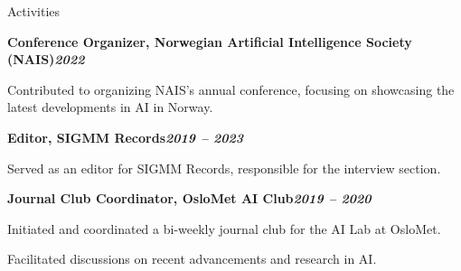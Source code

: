 \begin{rubric}{Activities}
\begin{compactitem}
\end{compactitem}
%
\entry*[]%
\textbf{Conference Organizer, Norwegian Artificial Intelligence Society (NAIS)\hfill\textit{2022}} \par
\begin{compactitem}
    \item Contributed to organizing NAIS's annual conference, focusing on showcasing the latest developments in AI in Norway.
    \vspace{-12pt}
\end{compactitem}
%
\entry*[]%
\textbf{Editor, SIGMM Records\hfill\textit{2019 -- 2023}} \par
\begin{compactitem}
    \item Served as an editor for SIGMM Records, responsible for the interview section.
    \vspace{-12pt}
\end{compactitem}
%
\entry*[]%
\textbf{Journal Club Coordinator, OsloMet AI Club\hfill\textit{2019 -- 2020}} \par
\begin{compactitem}
    \item Initiated and coordinated a bi-weekly journal club for the AI Lab at OsloMet.
    \item Facilitated discussions on recent advancements and research in AI.
    \vspace{-12pt}
\end{compactitem}
\end{rubric}